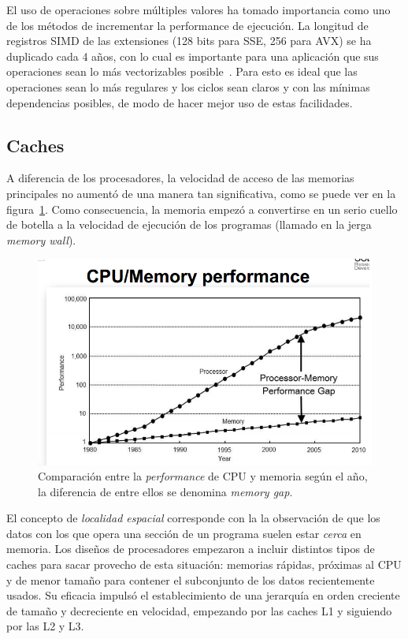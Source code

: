 El uso de operaciones sobre m\'ultiples valores ha tomado importancia como uno de los m\'etodos de incrementar la performance de ejecuci\'on. 
La longitud de registros SIMD de las extensiones (128 bits para SSE, 256 para AVX) se ha duplicado cada 4 a\~nos, con lo cual es importante para una aplicaci\'on que sus operaciones sean lo m\'as vectorizables posible~\cite{HennessyPatterson}. 
Para esto es ideal que las operaciones sean lo m\'as regulares y los ciclos sean claros y con las m\'inimas dependencias posibles, de modo de hacer mejor uso de estas facilidades.

\subsection{Caches}

A diferencia de los procesadores, la velocidad de acceso de las memorias principales no aument\'o de una manera tan significativa, como se puede ver en la figura~\ref{fig:cpu_vs_mem}. Como consecuencia, la memoria empez\'o a convertirse en un serio cuello de botella a la velocidad de ejecuci\'on de los programas (llamado en la jerga \textit{memory wall}).

\begin{figure}[htbp]
    \centering
    \includegraphics[width=\plotwidth]{images/cpu_vs_memory.png}
    \caption{Comparaci\'on entre la \textit{performance} de CPU y memoria seg\'un el a\~no, la diferencia de entre ellos se denomina \textit{memory gap}.}
    \label{fig:cpu_vs_mem}
    
\end{figure}

El concepto de \textit{localidad espacial} corresponde con la la observaci\'on de que los datos con los que opera una secci\'on de un programa suelen estar \emph{cerca} en memoria.
Los dise\~nos de procesadores empezaron a incluir distintos tipos de caches para sacar provecho de esta situaci\'on: memorias r\'apidas, pr\'oximas al CPU y de menor tama\~no para contener el subconjunto de los datos recientemente usados. 
Su eficacia impuls\'o el establecimiento de una jerarqu\'ia en orden creciente de tama\~no y decreciente en velocidad, empezando por las caches L1 y siguiendo por las L2 y L3.

